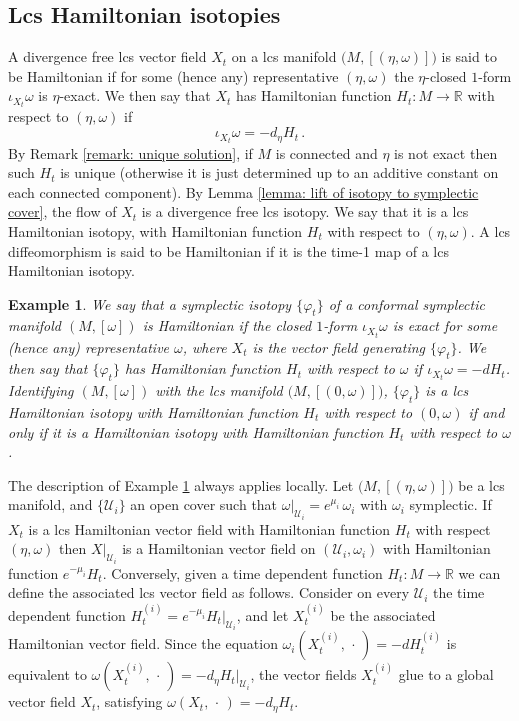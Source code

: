 \documentclass{amsart}
\newtheorem{example}[thm]{Example}
\theoremstyle{remark}
\begin{document}
\subsection{Lcs Hamiltonian isotopies}

A divergence free lcs vector field $X_t$ on a lcs manifold
$\big(M, [(\eta, \omega)]\big)$
is said to be Hamiltonian
if for some (hence any) representative $(\eta, \omega)$
the $\eta$-closed $1$-form $\iota_{X_t}\omega$ is $\eta$-exact.
We then say that $X_t$ has Hamiltonian function $H_t: M \rightarrow \mathbb{R}$
with respect to $(\eta, \omega)$ if
$$
\iota_{X_t}\omega = - d_{\eta} H_t \,.
$$
By Remark \ref{remark: unique solution},
if $M$ is connected and $\eta$ is not exact
then such $H_t$ is unique
(otherwise it is just determined
up to an additive constant
on each connected component).
By Lemma \ref{lemma: lift of isotopy to symplectic cover},
the flow of $X_t$ is a divergence free lcs isotopy.
We say that it is a lcs Hamiltonian isotopy,
with Hamiltonian function $H_t$ with respect to $(\eta, \omega)$.
A lcs diffeomorphism
is said to be Hamiltonian
if it is the time-1 map of a lcs Hamiltonian isotopy.

\begin{example}\label{example: Hamiltonian conformal}
We say that a symplectic isotopy $\{\varphi_t\}$
of a conformal symplectic manifold $(M, [\omega])$
is Hamiltonian
if the closed $1$-form $\iota_{X_t}\omega$ is exact
for some (hence any) representative $\omega$,
where $X_t$ is the vector field generating $\{\varphi_t\}$.
We then say that $\{\varphi_t\}$
has Hamiltonian function $H_t$ with respect to $\omega$
if $\iota_{X_t}\omega = -dH_t$.
Identifying $(M, [\omega])$
with the lcs manifold $\big(M , [(0, \omega)]\big)$,
$\{\varphi_t\}$ is a lcs Hamiltonian isotopy
with Hamiltonian function $H_t$ with respect to $(0, \omega)$
if and only if it is a Hamiltonian isotopy
with Hamiltonian function $H_t$ with respect to $\omega$.
\end{example}

The description of Example \ref{example: Hamiltonian conformal}
always applies locally.
Let $\big( M , [(\eta, \omega)] \big)$ be a lcs manifold,
and $\{\mathcal{U}_i\}$ an open cover
such that $\left. \omega \right\lvert_{\mathcal{U}_i} = e^{\mu_i} \, \omega_i$
with $\omega_i$ symplectic.
If $X_t$ is a lcs Hamiltonian vector field
with Hamiltonian function $H_t$
with respect $(\eta, \omega)$
then $\left. X \right\lvert_{\mathcal{U}_i}$
is a Hamiltonian vector field on $(\mathcal{U}_i, \omega_i)$
with Hamiltonian function $e^{-\mu_i}H_t$.
Conversely,
given a time dependent function $H_t: M \rightarrow \mathbb{R}$
we can define the associated lcs vector field as follows.
Consider on every $\mathcal{U}_i$
the time dependent function
$H_t^{(i)} = e^{-\mu_i} \left. H_t \right\lvert_{\mathcal{U}_i}$,
and let $X_t^{(i)}$ be the associated Hamiltonian vector field.
Since the equation $\omega_i (X_t^{(i)} ,\,\cdot\,) = - dH_t^{(i)}$
is equivalent to
$\omega (X_t^{(i)} ,\,\cdot\,) = - d_{\eta} \left. H_t \right\lvert_{\mathcal{U}_i}$,
the vector fields $X_t^{(i)}$ glue to a global vector field $X_t$,
satisfying $\omega (X_t ,\,\cdot\,) = - d_{\eta} H_t$.
\end{document}

